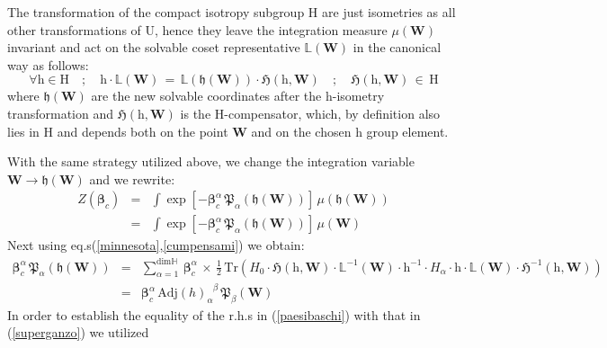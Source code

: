 \documentclass[10pt,a4paper]{article}
\newcommand{\ft}[2]{{\textstyle\frac{#1}{#2}}}
\begin{document}
The transformation of the compact isotropy subgroup $\mathrm{H}$ are just isometries as all other transformations of $\mathrm{U}$, hence they leave the integration measure $\mu(\mathbf{W})$ invariant and act on the solvable coset representative $\mathbb{L}(\mathbf{W})$ in the canonical way as follows:
\begin{equation}\label{cumpensami}
  \forall \mathrm{h}\in \mathrm{H} \quad ; \quad \mathrm{h}\cdot \mathbb{L}(\mathbf{W}) \, = \, \mathbb{L}(\mathfrak{h}(\mathbf{W}) ) \cdot \mathfrak{H}(\mathrm{h},\mathbf{W}) \quad ; \quad \mathfrak{H}(\mathrm{h},\mathbf{W}) \, \in \, \mathrm{H}
\end{equation}
where $\mathfrak{h}(\mathbf{W})$ are the new solvable coordinates after the $\mathrm{h}$-isometry transformation
and $\mathfrak{H}(\mathrm{h},\mathbf{W})$ is the H-compensator, which, by definition  also lies in $\mathrm{H}$ and depends both on the point $\mathbf{W}$ and on the chosen $\mathrm{h}$ group element.
\par
With the same strategy utilized above, we change the integration variable $\mathbf{W}\to\mathfrak{h}(\mathbf{W}) $ and we rewrite:
\begin{eqnarray}\label{dakota}
  Z(\boldsymbol{\beta}_c)& = &\int \exp\left[- \boldsymbol{\beta}_c^\alpha \, \boldsymbol{\mathfrak{P}}_\alpha(\mathfrak{h}(\mathbf{W}))\right] \, \mu(\mathbf{\mathfrak{h}(\mathbf{W})}) \nonumber\\
  &=& \int \exp\left[- \boldsymbol{\beta}_c^\alpha \, \boldsymbol{\mathfrak{P}}_\alpha(\mathfrak{h}(\mathbf{W}))\right] \, \mu(\mathbf{W})
\end{eqnarray}
Next using eq.s(\ref{minnesota},\ref{cumpensami}) we obtain:
\begin{eqnarray}
 \boldsymbol{\beta}_c^\alpha \, \boldsymbol{\mathfrak{P}}_\alpha(\mathfrak{h}(\mathbf{W})) &=&
 \sum_{\alpha=1}^{\text{dim} \mathbb{H}}\, \boldsymbol{\beta}_c^\alpha \, \times \,\ft 12 \, \text{Tr}
 \left(H_{0} \cdot \mathfrak{H}(\mathrm{h},\mathbf{W}) \cdot
  \mathbb{L}^{-1}(\mathbf{W})\cdot \mathrm{h}^{-1} \cdot H_\alpha \cdot \mathrm{h} \cdot \mathbb{L}(\mathbf{W})\cdot\mathfrak{H}^{-1}(\mathrm{h},\mathbf{W}) \right)  \label{paesibaschi}\\
  & = & \boldsymbol{\beta}_c^\alpha \, \mathrm{Adj}(h)_\alpha^{\phantom{\alpha}\beta} \, \boldsymbol{\mathfrak{P}}_\beta(\mathbf{W})  \label{superganzo}
\end{eqnarray}
In order to establish the equality of the r.h.s in (\ref{paesibaschi}) with that in (\ref{superganzo}) we utilized
\end{document}
